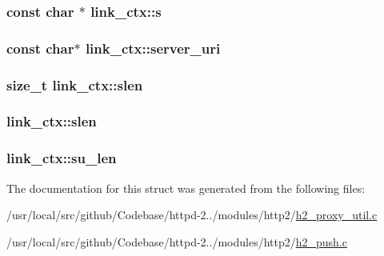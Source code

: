 \subsubsection[{\texorpdfstring{s}{s}}]{\setlength{\rightskip}{0pt plus 5cm}const char $\ast$ link\+\_\+ctx\+::s}\hypertarget{structlink__ctx_a14e856e2601e7577d7d309ba95a0f285}{}\label{structlink__ctx_a14e856e2601e7577d7d309ba95a0f285}
\subsubsection[{\texorpdfstring{server\+\_\+uri}{server_uri}}]{\setlength{\rightskip}{0pt plus 5cm}const char$\ast$ link\+\_\+ctx\+::server\+\_\+uri}\hypertarget{structlink__ctx_a7c623dde91255bcdf24411aff3a7ffbd}{}\label{structlink__ctx_a7c623dde91255bcdf24411aff3a7ffbd}
\subsubsection[{\texorpdfstring{slen}{slen}}]{\setlength{\rightskip}{0pt plus 5cm}size\+\_\+t link\+\_\+ctx\+::slen}\hypertarget{structlink__ctx_aa44ed2cc522848dcb00c52f402c8cf60}{}\label{structlink__ctx_aa44ed2cc522848dcb00c52f402c8cf60}
\subsubsection[{\texorpdfstring{slen}{slen}}]{ link\+\_\+ctx\+::slen}\hypertarget{structlink__ctx_aa58573da167852a59941a861393c517c}{}\label{structlink__ctx_aa58573da167852a59941a861393c517c}
\subsubsection[{\texorpdfstring{su\+\_\+len}{su_len}}]{ link\+\_\+ctx\+::su\+\_\+len}\hypertarget{structlink__ctx_af4ad908341ceba9edac7097462c86ed1}{}\label{structlink__ctx_af4ad908341ceba9edac7097462c86ed1}


The documentation for this struct was generated from the following files\+:\begin{DoxyCompactItemize}
\item 
/usr/local/src/github/\+Codebase/httpd-\/2../modules/http2/\hyperlink{h2__proxy__util_8c}{h2\+\_\+proxy\+\_\+util.\+c}\item 
/usr/local/src/github/\+Codebase/httpd-\/2../modules/http2/\hyperlink{h2__push_8c}{h2\+\_\+push.\+c}\end{DoxyCompactItemize}
